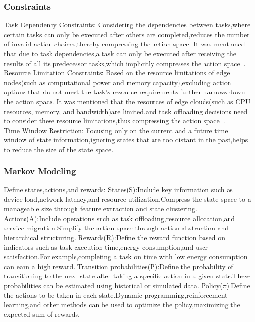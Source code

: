 \documentclass[journal]{IEEEtran}
\begin{document}
\subsubsection{Constraints}
Task Dependency Constraints: Considering the dependencies between tasks,where certain tasks can only be executed after others are completed,reduces the number of invalid action choices,thereby compressing the action space. It was mentioned that due to task dependencies,a task can only be executed after receiving the results of all its predecessor tasks,which implicitly compresses the action space~\cite{zhou01}.\\
Resource Limitation Constraints: Based on the resource limitations of edge nodes(such as computational power and memory capacity),excluding action options that do not meet the task's resource requirements further narrows down the action space. It was mentioned that the resources of edge clouds(such as CPU resources, memory, and bandwidth)are limited,and task offloading decisions need to consider these resource limitations,thus compressing the action space~\cite{zhou02}.\\
Time Window Restriction: Focusing only on the current and a future time window of state information,ignoring states that are too distant in the past,helps to reduce the size of the state space.~\cite{zhou01}

\subsubsection{Markov Modeling}
Define states,actions,and rewards:
States(S):Include key information such as device load,network latency,and resource utilization.Compress the state space to a manageable size through feature extraction and state clustering.
Actions(A):Include operations such as task offloading,resource allocation,and service migration.Simplify the action space through action abstraction and hierarchical structuring.
Rewards(R):Define the reward function based on indicators such as task execution time,energy consumption,and user satisfaction.For example,completing a task on time with low energy consumption can earn a high reward.
Transition probabilities(P):Define the probability of transitioning to the next state after taking a specific action in a given state.These probabilities can be estimated using historical or simulated data.
Policy($\pi$):Define the actions to be taken in each state.Dynamic programming,reinforcement learning,and other methods can be used to optimize the policy,maximizing the expected sum of rewards.~\cite{zhou05}
\end{document}
